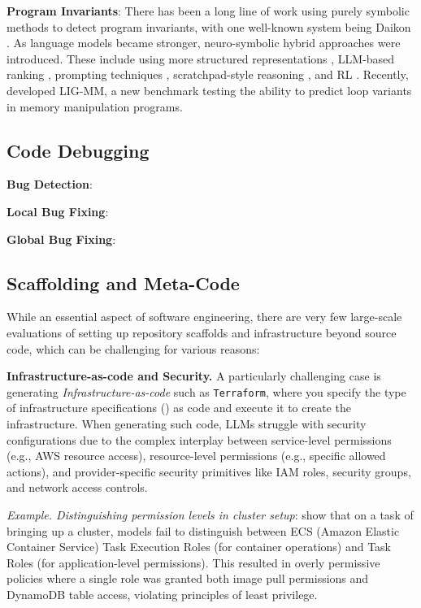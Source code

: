 \textbf{Program Invariants}: There has been a long line of work using purely symbolic methods to detect program invariants, with one well-known system being Daikon \citep{ernst2007daikon}. As language models became stronger, neuro-symbolic hybrid approaches were introduced. These include using more structured representations \citep{si2018learning}, LLM-based ranking \citep{chakraborty2023ranking}, prompting techniques \citep{kamath2023finding}, scratchpad-style reasoning \citep{pei2023can}, and RL \citep{yu2023loop}. Recently, \citet{liu2024towards} developed LIG-MM, a new benchmark testing the ability to predict loop variants in memory manipulation programs. 

\subsection{Code Debugging}


\textbf{Bug Detection}: 

\textbf{Local Bug Fixing}:

\textbf{Global Bug Fixing}:


\subsection{Scaffolding and Meta-Code}

While an essential aspect of software engineering, there are very few large-scale evaluations of \llms{} setting up repository scaffolds and infrastructure beyond source code, which can be challenging for various reasons:

\textbf{Infrastructure-as-code and Security.} A particularly challenging case is generating \textit{Infrastructure-as-code} such as \texttt{Terraform}, where you specify the type of infrastructure specifications () as code and execute it to create the infrastructure. When generating such code, LLMs struggle with security configurations due to the complex interplay between service-level permissions (e.g., AWS resource access), resource-level permissions (e.g., specific allowed actions), and provider-specific security primitives like IAM roles, security groups, and network access controls.

\textit{Example. Distinguishing permission levels in cluster setup}: \cite{terrateam2024} show that on a task of bringing up a cluster, models fail to distinguish between ECS (Amazon Elastic Container Service) Task Execution Roles (for container operations) and Task Roles (for application-level permissions). This resulted in overly permissive policies where a single role was granted both image pull permissions and DynamoDB table access, violating principles of least privilege.

